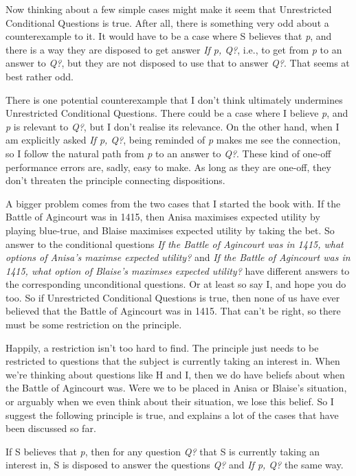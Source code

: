 \documentclass[
  10pt,
  letterpaper,
  twoside]{scrbook}
\providecommand{\tightlist}{%
  \setlength{\itemsep}{0pt}\setlength{\parskip}{0pt}}\usepackage{longtable,booktabs,array}
\begin{document}
Now thinking about a few simple cases might make it seem that
Unrestricted Conditional Questions is true. After all, there is
something very odd about a counterexample to it. It would have to be a
case where S believes that \emph{p}, and there is a way they are
disposed to get answer \emph{If p, Q?}, i.e., to get from \emph{p} to an
answer to \emph{Q?}, but they are not disposed to use that to answer
\emph{Q?}. That seems at best rather odd.

There is one potential counterexample that I don't think ultimately
undermines Unrestricted Conditional Questions. There could be a case
where I believe \emph{p}, and \emph{p} is relevant to \emph{Q?}, but I
don't realise its relevance. On the other hand, when I am explicitly
asked \emph{If p, Q?}, being reminded of \emph{p} makes me see the
connection, so I follow the natural path from \emph{p} to an answer to
\emph{Q?}. These kind of one-off performance errors are, sadly, easy to
make. As long as they are one-off, they don't threaten the principle
connecting dispositions.

A bigger problem comes from the two cases that I started the book with.
If the Battle of Agincourt was in 1415, then Anisa maximises expected
utility by playing blue-true, and Blaise maximises expected utility by
taking the bet. So answer to the conditional questions \emph{If the
Battle of Agincourt was in 1415, what options of Anisa's maximse
expected utility?} and \emph{If the Battle of Agincourt was in 1415,
what option of Blaise's maximses expected utility?} have different
answers to the corresponding unconditional questions. Or at least so say
I, and hope you do too. So if Unrestricted Conditional Questions is
true, then none of us have ever believed that the Battle of Agincourt
was in 1415. That can't be right, so there must be some restriction on
the principle.

Happily, a restriction isn't too hard to find. The principle just needs
to be restricted to questions that the subject is currently taking an
interest in. When we're thinking about questions like H and I, then we
do have beliefs about when the Battle of Agincourt was. Were we to be
placed in Anisa or Blaise's situation, or arguably when we even think
about their situation, we lose this belief. So I suggest the following
principle is true, and explains a lot of the cases that have been
discussed so far.

\begin{description}
\tightlist
\item[Relevant Conditional Questions]
If S believes that \emph{p}, then for any question \emph{Q?} that S is
currently taking an interest in, S is disposed to answer the questions
\emph{Q?} and \emph{If p, Q?} the same way.
\end{description}
\end{document}
